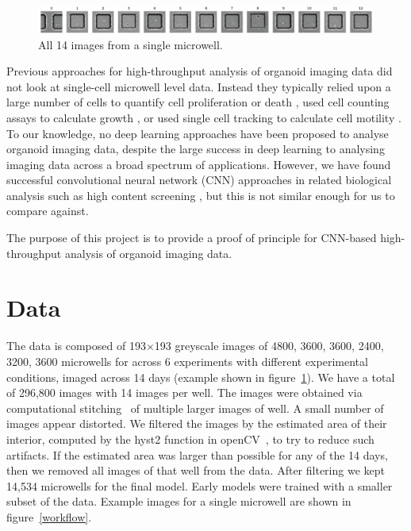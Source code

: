 \documentclass[10pt,twocolumn,letterpaper]{article}
\begin{document}
 \begin{figure}[t!]
\begin{center}
\includegraphics[width=0.9\linewidth]{figures/classification/well_4166_condition_A1_all_days_images_small.pdf}
\end{center}
   \caption{All 14 images from a single microwell.}
\label{well_4166_condition_A1_all_days_images_small}
\end{figure}

Previous approaches for high-throughput analysis of organoid imaging data did not look at single-cell microwell level data.  Instead they typically relied upon a large number of cells to quantify cell proliferation or death \cite{jabs2017screening},  used cell counting assays to calculate growth \cite{sebrell2018live}, or used single cell tracking to calculate cell motility \cite{geum2016epidermal}.  To our knowledge, no deep learning approaches have been proposed to analyse organoid imaging data, despite the large success in deep learning to analysing imaging data across a broad spectrum of applications.  However, we have found successful convolutional neural network (CNN) approaches in related biological analysis such as high content screening \cite{simm2018repurposing}, but this is not similar enough for us to compare against.



The purpose of this project is to provide a proof of principle for CNN-based high-throughput analysis of organoid imaging data.  



\section{Data}








The data is composed of 193$\times$193 greyscale images of 4800, 3600, 3600, 2400, 3200, 3600 microwells for across 6 experiments with different experimental conditions, imaged across 14 days (example shown in figure~\ref{well_4166_condition_A1_all_days_images_small}).  We have a total of 296,800 images with 14 images per well.  The images were obtained via computational stitching~\cite{preibisch2009globally} of multiple larger images of well.  A small number of images appear distorted.  We filtered the images by the estimated area of their interior, computed by the hyst2 function in openCV~\cite{opencv_library}, to try to reduce such artifacts.  If the estimated area was larger than possible for any of the 14 days, then we removed all images of that well from the data.  After filtering we kept 14,534 microwells for the final model.  Early models were trained with a smaller subset of the data.  Example images for a single microwell are shown in figure~\ref{workflow}.
\end{document}
